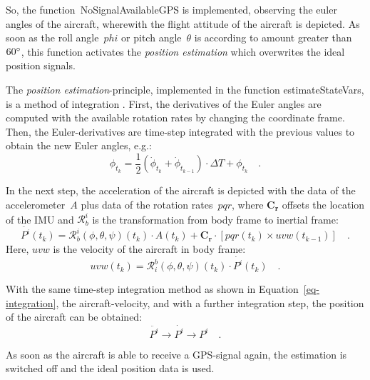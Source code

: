 \documentclass[11pt,a4paper]{scrartcl}		%
\begin{document}
\smallskip

So, the function~\textsf{NoSignalAvailableGPS} is implemented, observing the euler angles of the aircraft, wherewith the flight attitude of the aircraft is depicted.
As soon as the roll angle~$phi$ or pitch angle~$\theta$ is according to amount greater than $60\degree$, this function activates the \textsl{position estimation} which overwrites the ideal position signals.

\smallskip

The \textsl{position estimation}-principle, implemented in the function \textsf{estimateStateVars}, is a method of integration \cite{Dantsker.2016}.
First, the derivatives of the Euler angles are computed with the available rotation rates by changing the coordinate frame. 
Then, the Euler-derivatives are time-step integrated with the previous values to obtain the new Euler angles, e.g.:
\begin{equation}\label{eq-integration}
 \phi_{t_k} = \frac{1}{2}(\dot{\phi}_{t_k}+\dot{\phi}_{t_{k-1}})\cdot \Delta T + \phi_{t_k} \quad .
\end{equation}

In the next step, the acceleration of the aircraft is depicted with the data of the accelerometer~$A$ plus data of the rotation rates~$pqr$, where $\mathbf{C_r}$ offsets the location of the IMU and $\mathcal{R}_b^i$ is the transformation from body frame to inertial frame:
\begin{equation}
\ddot{P^i}(t_k)= \mathcal{R}_b^i(\phi,\theta,\psi)(t_k)\cdot A(t_k) + \mathbf{C_r} \cdot \left[ pqr(t_k) \times uvw(t_{k-1})\right] \quad .
\end{equation}
Here, $uvw$ is the velocity of the aircraft in body frame:
\begin{equation}
uvw(t_k) = \mathcal{R}_i^b(\phi,\theta,\psi)(t_k) \cdot \dot{P^i}(t_k) \quad .
\end{equation}

With the same time-step integration method as shown in Equation~\ref{eq-integration}, the aircraft-velocity, and with a further integration step, the position of the aircraft can be obtained:
\begin{equation}
\ddot{P^i} \rightarrow \dot{P^i} \rightarrow P^i \quad .
\end{equation}

\smallskip

As soon as the aircraft is able to receive a GPS-signal again, the estimation is switched off and the ideal position data is used.
\end{document}
